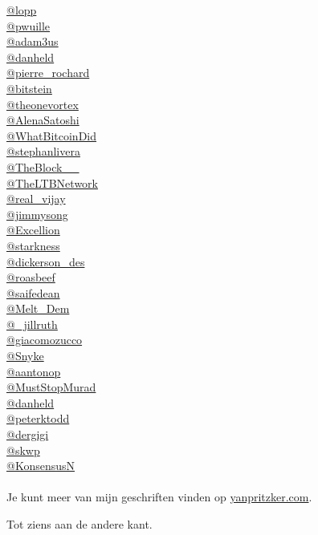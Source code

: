 \noindent\href{https://twitter.com/lopp}{@lopp}
\\\noindent\href{https://twitter.com/pwuille}{@pwuille}
\\\noindent\href{https://twitter.com/adam3us}{@adam3us}
\\\noindent\href{https://twitter.com/danheld}{@danheld}
\\\noindent\href{https://twitter.com/pierre\_rochard}{@pierre\_rochard}
\\\noindent\href{https://twitter.com/bitstein}{@bitstein}
\\\noindent\href{https://twitter.com/theonevortex}{@theonevortex}
\\\noindent\href{https://twitter.com/AlenaSatoshi}{@AlenaSatoshi}
\\\noindent\href{https://twitter.com/WhatBitcoinDid}{@WhatBitcoinDid}
\\\noindent\href{https://twitter.com/stephanlivera}{@stephanlivera}
\\\noindent\href{https://twitter.com/TheBlock\_\_}{@TheBlock\_\_}
\\\noindent\href{https://twitter.com/TheLTBNetwork}{@TheLTBNetwork}
\\\noindent\href{https://twitter.com/real\_vijay}{@real\_vijay}
\\\noindent\href{https://twitter.com/jimmysong}{@jimmysong}
\\\noindent\href{https://twitter.com/Excellion}{@Excellion}
\\\noindent\href{https://twitter.com/starkness}{@starkness}
\\\noindent\href{https://twitter.com/dickerson\_des}{@dickerson\_des}
\\\noindent\href{https://twitter.com/roasbeef}{@roasbeef}
\\\noindent\href{https://twitter.com/saifedean}{@saifedean}
\\\noindent\href{https://twitter.com/Melt\_Dem}{@Melt\_Dem}
\\\noindent\href{https://twitter.com/\_jillruth}{@\_jillruth}
\\\noindent\href{https://twitter.com/giacomozucco}{@giacomozucco}
\\\noindent\href{https://twitter.com/Snyke}{@Snyke}
\\\noindent\href{https://twitter.com/aantonop}{@aantonop}
\\\noindent\href{https://twitter.com/MustStopMurad}{@MustStopMurad}
\\\noindent\href{https://twitter.com/danheld}{@danheld}
\\\noindent\href{https://twitter.com/peterktodd}{@peterktodd}
\\\noindent\href{https://twitter.com/dergigi}{@dergigi}
\\\noindent\href{https://twitter.com/skwp}{@skwp}
\\\noindent\href{https://twitter.com/konsensusn}{@KonsensusN}
\paragraph{}


Je kunt meer van mijn geschriften vinden op  \href{https://yanpritzker.com}{yanpritzker.com}.

\noindent \hspace{-0.5\baselineskip} Tot ziens aan de andere kant.

